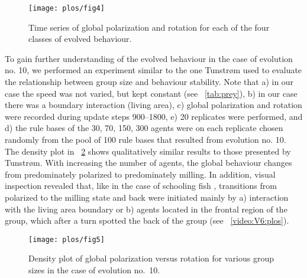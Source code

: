 \begin{figure}
  \texttt{[image: plos/fig4]}
  \caption{Time series of global polarization and rotation for each of the four classes of evolved behaviour.}
  \label{fig4}
\end{figure}
To gain further understanding of the evolved behaviour in the case of evolution no. 10, we performed an experiment similar to the one Tunstrøm\etal \cite[\figurename~3]{tunstrom2013collective} used to evaluate the relationship between group size and behaviour stability. Note that a) in our case the speed was not varied, but kept constant (see \tablename~\ref{tab:prey}), b) in our case there was a boundary interaction (living area), c) global polarization and rotation were recorded during update steps \numrange{900}{1800}, e) 20 replicates were performed, and d) the rule bases of the 30, 70, 150, 300 agents were on each replicate chosen randomly from the pool of 100 rule bases that resulted from evolution no. 10. The density plot in \figurename~\ref{fig5} shows qualitatively similar results to those presented by Tunstrøm\etal \cite[\figurename~2]{tunstrom2013collective}. With increasing the number of agents, the global behaviour changes from predominately polarized to predominately milling. In addition, visual inspection revealed that, like in the case of schooling fish \cite[\figurename~6]{tunstrom2013collective}, transitions from polarized to the milling state and back were initiated mainly by a) interaction with the living area boundary or b) agents located in the frontal region of the group, which after a turn spotted the back of the group (see \videoname~\ref{video:V6:plos}).

\begin{figure}
  \texttt{[image: plos/fig5]}
  \caption{Density plot of global polarization versus rotation for various group sizes in the case of evolution no.~10.}
  \label{fig5}
\end{figure}

